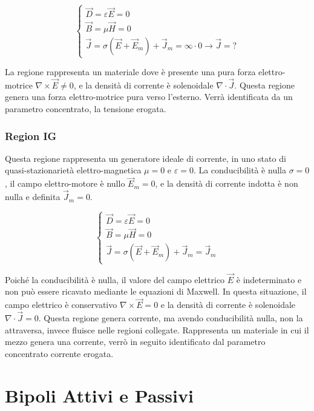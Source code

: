 \documentclass{article}
\numberwithin{equation}{subsection}
\begin{document}
\begin{equation*}
    \begin{cases}
        \vec{D}=\varepsilon\vec{E}=0\\
        \vec{B}=\mu\vec{H}=0\\
        \vec{J}=\sigma(\vec{E}+\vec{E}_m)+\vec{J}_m=\infty\cdot0\to\vec{J}=?
    \end{cases}
\end{equation*}

La regione rappresenta un materiale dove è presente una pura forza elettro-motrice $\nabla\times\vec{E}\neq0$, e la densità di corrente è solenoidale $\nabla\cdot\vec{J}$. 
Questa regione genera una forza elettro-motrice pura verso l'esterno. 
Verrà identificata da un parametro concentrato, la tensione erogata.

\subsubsection{Region IG}

Questa regione rappresenta un generatore ideale di corrente, in uno stato di quasi-stazionarietà elettro-magnetica $\mu=0$ e $\varepsilon=0$. La conducibilità è nulla $\sigma=0$, 
il campo elettro-motore è nullo $\vec{E}_m=0$, e la densità di corrente indotta è non nulla e definita $\vec{J}_m=0$. 

\begin{equation*}
    \begin{cases}
        \vec{D}=\varepsilon\vec{E}=0\\
        \vec{B}=\mu\vec{H}=0\\
        \vec{J}=\sigma(\vec{E}+\vec{E}_m)+\vec{J}_m=\vec{J}_m
    \end{cases}
\end{equation*}

Poiché la conducibilità è nulla, il valore del campo elettrico $\vec{E}$ è indeterminato e non può essere ricavato mediante le equazioni di Maxwell. In 
questa situazione, il campo elettrico è conservativo $\nabla\times\vec{E}=0$ e la densità di corrente è solenoidale $\nabla\cdot\vec{J}=0$. 
Questa regione genera corrente, ma avendo conducibilità nulla, non la attraversa, invece fluisce nelle regioni collegate. Rappresenta un materiale in cui il 
mezzo genera una corrente, verrò in seguito identificato dal parametro concentrato corrente erogata.

\clearpage

\section{Bipoli Attivi e Passivi}
\end{document}
